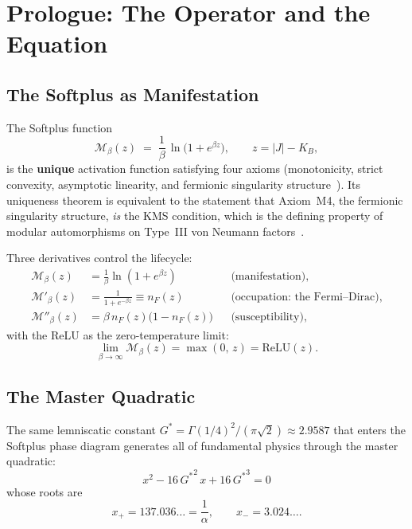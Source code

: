 \documentclass[12pt, letterpaper]{article}
\theoremstyle{plain}
\theoremstyle{definition}
\theoremstyle{remark}
\newcommand{\Mop}{\mathcal{M}}            %
\newcommand{\Gstar}{{G^{*}}}              %
\newcommand{\KB}{K_{\!B}}                 %
\newcommand{\nF}{n_{\!F}}                 %
\begin{document}
\section{Prologue: The Operator and the Equation}

\subsection{The Softplus as Manifestation}

The Softplus function
\begin{equation}\label{eq:softplus}
  \Mop_\beta(z) \;=\; \frac{1}{\beta}\,\ln\!\bigl(1 + e^{\beta z}\bigr),
  \qquad z = |J| - \KB,
\end{equation}
is the \textbf{unique} activation function satisfying four axioms (monotonicity, strict convexity, asymptotic linearity, and fermionic singularity structure~\cite{ReLU}). Its uniqueness theorem is equivalent to the statement that Axiom~M4, the fermionic singularity structure, \emph{is} the KMS condition, which is the defining property of modular automorphisms on Type~III von Neumann factors~\cite{RT}.

Three derivatives control the lifecycle:
\begin{align}
  \Mop_\beta(z)    &= \frac{1}{\beta}\ln(1 + e^{\beta z})
    && \text{(manifestation)}, \label{eq:M}\\[4pt]
  \Mop'_\beta(z)   &= \frac{1}{1 + e^{-\beta z}} \equiv \nF(z)
    && \text{(occupation: the Fermi--Dirac)}, \label{eq:Mprime}\\[4pt]
  \Mop''_\beta(z)  &= \beta\,\nF(z)\bigl(1 - \nF(z)\bigr)
    && \text{(susceptibility)}, \label{eq:Mdoubleprime}
\end{align}
with the ReLU as the zero-temperature limit:
\begin{equation}\label{eq:relu}
  \lim_{\beta \to \infty}\Mop_\beta(z) = \max(0,\, z) = \mathrm{ReLU}(z).
\end{equation}

\subsection{The Master Quadratic}

The same lemniscatic constant $\Gstar = \Gamma(1/4)^2\!/(\pi\sqrt{2}) \approx 2.9587$ that enters the Softplus phase diagram generates all of fundamental physics through the master quadratic:
\begin{equation}\label{eq:quadratic}
  \boxed{x^2 - 16\,\Gstar^{\!2}\,x + 16\,\Gstar^{\!3} = 0}
\end{equation}
whose roots are
\begin{equation}\label{eq:roots}
  x_+ = 137.036\ldots = \frac{1}{\alpha},
  \qquad
  x_- = 3.024\ldots.
\end{equation}
\end{document}
